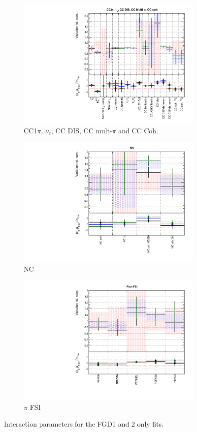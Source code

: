 \begin{figure}
\begin{subfigure}{0.49\textwidth}
  \centering
  \includegraphics[width=0.9\linewidth]{figs/fgdfitsxsec_3}
  \caption{CC1$\pi$, $\nu_e$, CC DIS, CC mult-$\pi$ and CC Coh.}
\end{subfigure}
\begin{subfigure}{0.49\textwidth}
  \centering
  \includegraphics[width=0.9\linewidth]{figs/fgdfitsxsec_4}
  \caption{NC}
\end{subfigure}
\begin{subfigure}{0.49\textwidth}
  \centering
  \includegraphics[width=0.9\linewidth]{figs/fgdfitsxsec_5}
  \caption{$\pi$ FSI}
\end{subfigure}
\caption{Interaction parameters for the FGD1 and 2 only fits.}
\label{fig:fgdxsec}
\end{figure}

